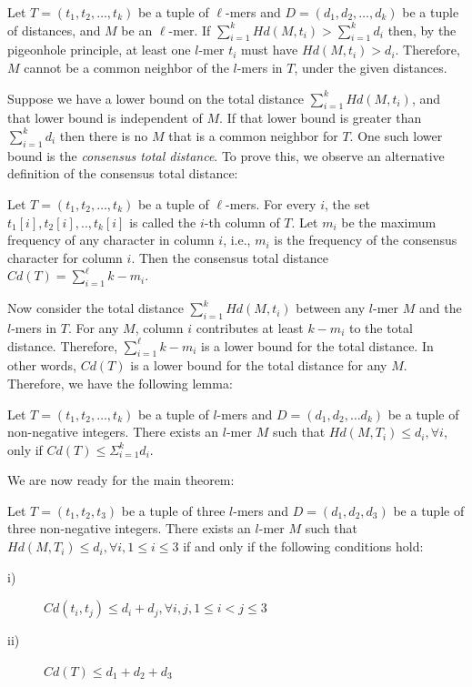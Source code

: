 \begin{lemma}
\label{lemma_pms_total_dist}
Let $T=(t_1,t_2,\ldots,t_k)$ be a tuple of $\ell$-mers and 
$D=(d_1,d_2,\ldots,d_k)$ be a tuple of distances, and $M$ be an $\ell$-mer. If
$\sum_{i=1}^{k}Hd(M,t_i) > \sum_{i=1}^{k}d_i$ then, by the pigeonhole
principle, at least one $l$-mer $t_i$ must have $Hd(M,t_i) > d_i$. Therefore,
$M$ cannot be a common neighbor of the $l$-mers in $T$, under the given
distances.
\end{lemma}

Suppose we have a lower bound on the total distance $\sum_{i=1}^{k}Hd(M,t_i)$,
and that lower bound is independent of $M$. If that lower bound is
greater than $\sum_{i=1}^{k}d_i$ then there is no $M$ that is a common neighbor for
$T$. One such lower bound is the {\em
consensus total distance}.
To prove this, we observe an alternative definition of the consensus total
distance:

\begin{lemma}
Let $T=(t_1,t_2,\ldots,t_k)$ be a tuple of $\ell$-mers. For every $i$, the set
$t_1[i],t_2[i],..,t_k[i]$ is called the $i$-th column of $T$.
Let $m_i$ be the maximum frequency of any character in column $i$, i.e., $m_i$
is the frequency of the consensus character for column $i$.
Then the consensus total distance $Cd(T)=\sum_{i=1}^{\ell}k-m_i$.
\end{lemma}

Now consider the total distance $\sum_{i=1}^{k}Hd(M,t_i)$ between any $l$-mer
$M$ and the $l$-mers in $T$.
For any $M$, column $i$ contributes at least $k-m_i$ to the total
distance. Therefore, $\sum_{i=1}^{\ell}k-m_i$ is a lower bound for the total
distance. In other words, $Cd(T)$ is a lower bound
for the total distance for any $M$. Therefore, we have the following lemma:

\begin{lemma}
\label{lemma_consensus}
Let $T=(t_1,t_2,\ldots,t_k)$ be a tuple of $l$-mers and
$D=(d_1,d_2,\ldots d_k)$ be a tuple of non-negative integers.
There exists an $l$-mer $M$ such that $Hd(M,T_i)\leq d_i, \forall i$, only if
$Cd(T)\leq \Sigma_{i=1}^kd_i$.
\end{lemma}

We are now ready for the main theorem:

\begin{theorem}
\label{th_3sufficient}
Let $T=(t_1,t_2,t_3)$ be a tuple of three $l$-mers and $D=(d_1,d_2,d_3)$ be
a tuple of three non-negative integers. There exists an $l$-mer $M$ such that
$Hd(M,T_i)\leq d_i, \forall i, 1\leq i\leq 3$ if and only if the following conditions hold:
\begin{description}
\item[i)]  $Cd(t_i,t_j)\leq d_i+d_j, \forall i,j, 1 \leq i < j \leq 3$
\item[ii)] $Cd(T) \leq d_1+d_2+d_3$
\end{description}
\end{theorem}


